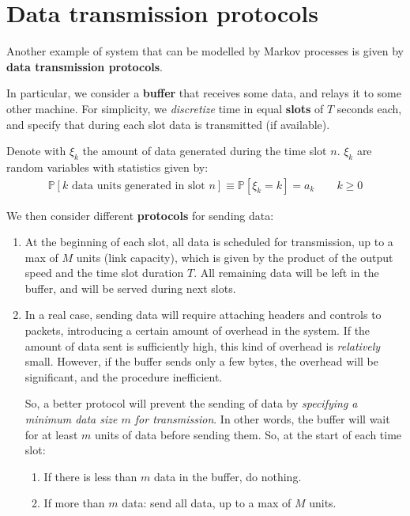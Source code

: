 \documentclass[../template.tex]{subfiles}
\begin{document}
\section{Data transmission protocols}
Another example of system that can be modelled by Markov processes is given by \textbf{data transmission protocols}.

\medskip

In particular, we consider a \textbf{buffer} that receives some data, and relays it to some other machine. For simplicity, we \textit{discretize} time in equal \textbf{slots} of $T$ seconds each, and specify that during each slot data is transmitted (if available).

\medskip

Denote with $\xi_k$ the amount of data generated during the time slot $n$. $\xi_k$ are random variables with statistics given by:
\begin{align*}
    \mathbb{P}[k \text{ data units generated in slot $n$}] \equiv \mathbb{P}[\xi_k = k] = a_k \qquad k\geq 0
\end{align*}

We then consider different \textbf{protocols} for sending data:
\begin{enumerate}
    \item At the beginning of each slot, all data is scheduled for transmission, up to a max of $M$ units (link capacity), which is given by the product of the output speed and the time slot duration $T$. All remaining data will be left in the buffer, and will be served during next slots.
    \item In a real case, sending data will require attaching headers and controls to packets, introducing a certain amount of overhead in the system. If the amount of data sent is sufficiently high, this kind of overhead is \textit{relatively} small. However, if the buffer sends only a few bytes, the overhead will be significant, and the procedure inefficient.  
    
    \medskip

    So, a better protocol will prevent the sending of  data by \textit{specifying a minimum data size $m$ for transmission}. In other words, the buffer will wait for at least $m$ units of data before sending them. So, at the start of each time slot:
    \begin{enumerate}
        \item If there is less than $m$ data in the buffer, do nothing.
        \item If more than $m$ data: send all data, up to a max of $M$ units. 
    \end{enumerate}
    
\end{enumerate}
\end{document}

